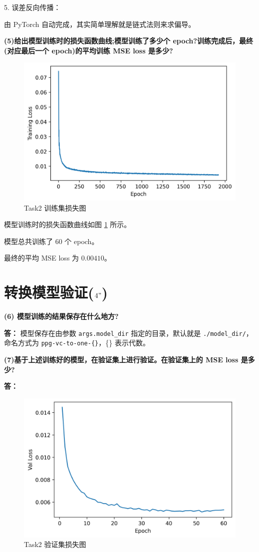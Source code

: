 \documentclass[degree=project,degree-type=project,cjk-font=noto]{thuthesis}
\begin{document}
5. 误差反向传播：

由 PyTorch 自动完成，其实简单理解就是链式法则来求偏导。

\textbf{(5)给出模型训练时的损失函数曲线;模型训练了多少个 epoch?训练完成后，最终 (对应最后一个 epoch)的平均训练 MSE loss 是多少?}

\begin{figure}[h]
\centering%
\includegraphics[width=.75\linewidth]{task2_train.png}
  \caption{Task2 训练集损失图}
  \label{fig:task2_train}
\end{figure}

模型训练时的损失函数曲线如图 \ref{fig:task2_train} 所示。

模型总共训练了 60 个 epoch。

最终的平均 MSE loss 为 $0.00410$。

\section{转换模型验证($4"$)}

\textbf{(6) 模型训练的结果保存在什么地方?}

\textbf{答：}
模型保存在由参数 \texttt{args.model\_dir} 指定的目录，默认就是 \texttt{./model\_dir/}，命名方式为 \texttt{ppg-vc-to-one-\{\}}，\{\} 表示代数。

\textbf{(7)基于上述训练好的模型，在验证集上进行验证。在验证集上的 MSE loss 是多少?}

\textbf{答：}

\begin{figure}[h]
\centering%
\includegraphics[width=.75\linewidth]{task2_val.png}
  \caption{Task2 验证集损失图}
  \label{fig:task2_val}
\end{figure}
\end{document}
